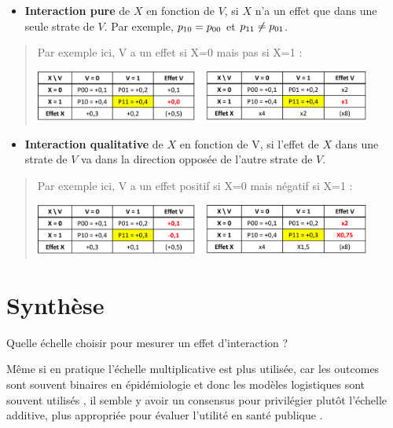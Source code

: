 \documentclass[
]{book}
\providecommand{\tightlist}{%
  \setlength{\itemsep}{0pt}\setlength{\parskip}{0pt}}
\begin{document}
\begin{itemize}
\tightlist
\item
  \textbf{Interaction pure} de \(X\) en fonction de \(V\), si \(X\) n'a un effet que dans une seule strate de \(V\). Par exemple, \(\small p_{10} = p_{00}\) et \(\small p_{11} \neq p_{01}\).
\end{itemize}

\begin{quote}
Par exemple ici, V a un effet si X=0 mais pas si X=1 :

\includegraphics[width=0.9\textwidth,height=\textheight]{img/Image8.png}
\end{quote}

\begin{itemize}
\tightlist
\item
  \textbf{Interaction qualitative} de \(X\) en fonction de V, si l'effet de \(X\) dans une strate de \(V\) va dans la direction opposée de l'autre strate de \(V\).
\end{itemize}

\begin{quote}
Par exemple ici, V a un effet positif si X=0 mais négatif si X=1 :

\includegraphics[width=0.9\textwidth,height=\textheight]{img/Image9.png}
\end{quote}

\hypertarget{synthuxe8se-1}{%
\section{Synthèse}\label{synthuxe8se-1}}

Quelle échelle choisir pour mesurer un effet d'interaction ?

Même si en pratique l'échelle multiplicative est plus utilisée, car les outcomes sont souvent binaires en épidémiologie et donc les modèles logistiques sont souvent utilisés \citet{knol_recommendations_2012}, il semble y avoir un consensus pour privilégier plutôt l'échelle additive, plus appropriée pour évaluer l'utilité en santé publique \citet{vanderweele_tutorial_2014} \citet{knol_recommendations_2012}.
\end{document}
